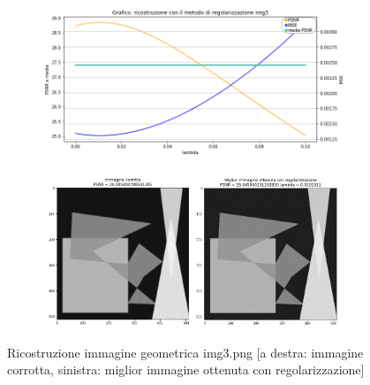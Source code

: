 \begin{figure}[H]
    \begin{subfigure}{0.5\textwidth}
        \includegraphics[width=\textwidth]{imgRicostruzione/grafico3minimize.png}
    \end{subfigure}%
    \begin{subfigure}{0.5\textwidth}
        \centering
        \includegraphics[width=\textwidth]{imgRicostruzione/ricostruzione3minimize.png}
    \end{subfigure}
    \caption{Ricostruzione immagine geometrica img3.png [a destra: immagine corrotta, sinistra: miglior immagine ottenuta con regolarizzazione]}


\end{figure}
